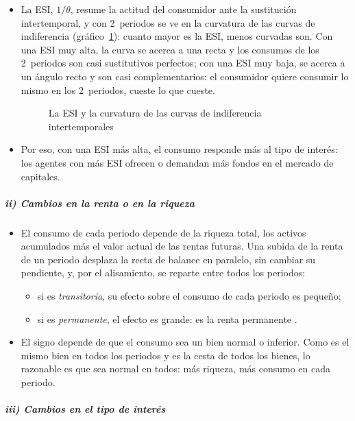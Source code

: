 \documentclass[11pt]{article}
\begin{document}
\begin{itemize}
\item La ESI, $1/\theta$, resume la actitud del consumidor ante la sustitución intertemporal, y con 2~periodos se ve en la curvatura de las curvas de indiferencia (gráfico~\ref{fig:esi-curvatura}): cuanto mayor es la ESI, menos curvadas son. Con una ESI muy alta, la curva se acerca a una recta y los consumos de los 2~periodos son casi sustitutivos perfectos; con una ESI muy baja, se acerca a un ángulo recto y son casi complementarios: el consumidor quiere consumir lo mismo en los 2~periodos, cueste lo que cueste.
  \begin{figure}[H]
  \centering
  \caption{La ESI y la curvatura de las curvas de indiferencia intertemporales}\label{fig:esi-curvatura}
  \end{figure}
\item Por eso, con una ESI más alta, el consumo responde más al tipo de interés: los agentes con más ESI ofrecen o demandan más fondos en el mercado de capitales.
\end{itemize}

\subparagraph{ii) Cambios en la renta o en la riqueza}

\begin{itemize}
\item El consumo de cada periodo depende de la riqueza total, los activos acumulados más el valor actual de las rentas futuras. Una subida de la renta de un periodo desplaza la recta de balance en paralelo, sin cambiar su pendiente, y, por el alisamiento, se reparte entre todos los periodos:
  \begin{itemize}
  \item si es \emph{transitoria}, su efecto sobre el consumo de cada periodo es pequeño;
  \item si es \emph{permanente}, el efecto es grande: es la renta permanente .
  \end{itemize}
\item El signo depende de que el consumo sea un bien normal o inferior. Como es el mismo bien en todos los periodos y es la cesta de todos los bienes, lo razonable es que sea normal en todos: más riqueza, más consumo en cada periodo.
\end{itemize}

\subparagraph{iii) Cambios en el tipo de interés}
\end{document}
